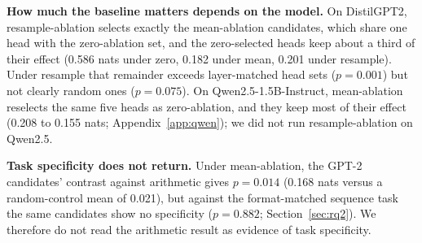 \documentclass{article}
\begin{document}
\textbf{How much the baseline matters depends on the model.} On
DistilGPT2, resample-ablation selects exactly the mean-ablation
candidates, which share one head with the zero-ablation set, and the
zero-selected heads keep about a third of their effect (0.586 nats under
zero, 0.182 under mean, 0.201 under resample). Under resample that
remainder exceeds layer-matched head sets ($p=0.001$) but not clearly
random ones ($p=0.075$). On Qwen2.5-1.5B-Instruct, mean-ablation
reselects the same five heads as zero-ablation, and they keep most of
their effect (0.208 to 0.155 nats; Appendix~\ref{app:qwen}); we did not
run resample-ablation on Qwen2.5.

\textbf{Task specificity does not return.} Under mean-ablation, the
GPT-2 candidates' contrast against arithmetic gives $p=0.014$ (0.168
nats versus a random-control mean of 0.021), but against the
format-matched sequence task the same candidates show no specificity
($p=0.882$; Section~\ref{sec:rq2}). We therefore do not read the
arithmetic result as evidence of task specificity.
\end{document}
